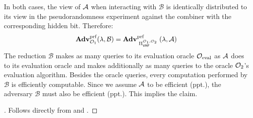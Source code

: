 In both cases, the view of $\mathcal{A}$ when interacting with $\mathcal B$ is identically distributed to its view in the pseudorandomness experiment against the combiner with the corresponding hidden bit. Therefore:
\[
	\Adv*{\O_1}{prf}{\lambda, \mathcal B} = \Adv{\BBComb{VRF}[\O_1, \O_2]}{prf}{\lambda, \A}
\]
The reduction $\mathcal B$ makes as many queries to its evaluation oracle $\mathcal{O}_{\text{eval}}$ as $\mathcal{A}$ does to its evaluation oracle
and makes additionally as many queries to the oracle $\mathcal{O}_{2}$'s evaluation algorithm. Besides the oracle queries, every computation performed by $\mathcal B$
is efficiently computable. Since we assume $\mathcal{A}$ to be efficient (ppt.), the adversary $\mathcal B$ must also be efficient (ppt.).
This implies the claim.

\begin{proof}[]
	Follows directly from  and .
\end{proof}